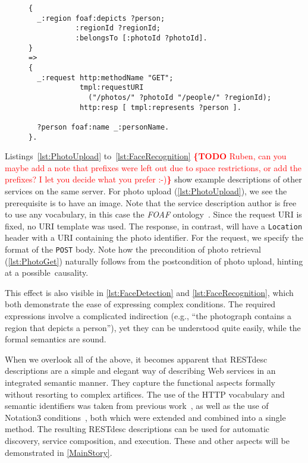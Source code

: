 \documentclass[runningheads,a4paper, twocolumn]{llncs}
\newcommand{\todo}[1]{\noindent\textcolor{red}{{\bf \{TODO} #1{\bf \}}}}
\begin{document}
\begin{figure}[float=t!]
\begin{lstlisting}[caption=RESTdesc description of face recognition,
                   label=lst:FaceRecognition, escapechar=§, belowcaptionskip=0em]
{
  _:region foaf:depicts ?person;
           :regionId ?regionId;
           :belongsTo [:photoId ?photoId].
}
=>
{
  _:request http:methodName "GET";
            tmpl:requestURI
              ("/photos/" ?photoId "/people/" ?regionId);
            http:resp [ tmpl:represents ?person ].
  
  ?person foaf:name _:personName.
}.
\end{lstlisting}
\vspace{-2em}
\end{figure}

Listings~\ref{lst:PhotoUpload} to~\ref{lst:FaceRecognition} \todo{Ruben, can you maybe add a note that prefixes were left out due to space restrictions, or add the prefixes? I let you decide what you prefer :-)} show example descriptions of other services on the same server. For photo upload (\autoref{lst:PhotoUpload}), we see the prerequisite is to have an image. Note that the service description author is free to use any vocabulary, in this case the \emph{FOAF} ontology~\cite{FOAF}. Since the request URI is fixed, no URI template was used. The response, in contrast, will have a \Verb!Location! header with a URI containing the photo identifier. For the request, we specify the format of the \Verb!POST! body. Note how the precondition of photo retrieval (\autoref{lst:PhotoGet}) naturally follows from the postcondition of photo upload, hinting at a possible~causality.

This effect is also visible in \autoref{lst:FaceDetection} and \autoref{lst:FaceRecognition}, which both demonstrate the ease of expressing complex conditions. The required expressions involve a complicated indirection (e.g., ``the photograph contains a region that depicts a person''), yet they can be understood quite easily, while the formal semantics are sound.

When we overlook all of the above, it becomes apparent that RESTdesc descriptions are a simple and elegant way of describing Web services in an integrated semantic manner. They capture the functional aspects formally without resorting to complex artifices. The use of the HTTP vocabulary and semantic identifiers was taken from previous work~\cite{Steiner:2011p5006}, as well as the use of \mbox{Notation3} conditions~\cite{Verborgh:2010p2746}, both which were extended and combined into a single method. The resulting \mbox{RESTdesc} descriptions can be used for automatic discovery, service composition, and execution. These and other aspects will be demonstrated in \autoref{MainStory}.
\end{document}

